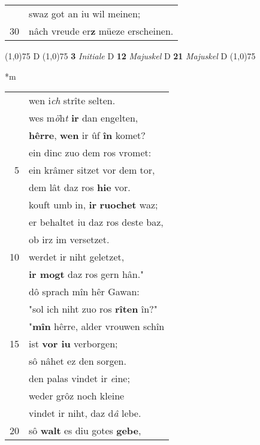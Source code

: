 \documentclass[8pt,a4paper,notitlepage]{article}
\begin{document}
\begin{table}[ht]
\begin{minipage}[t]{0.5\linewidth}
\begin{tabular}{rl}
 & swaz got an iu wil meinen;\\ 
30 & nâch vreude er\textbf{z} müeze erscheinen.\\ 
\end{tabular}
\scriptsize
\line(1,0){75} \newline
D \newline
\line(1,0){75} \newline
\textbf{3} \textit{Initiale} D  \textbf{12} \textit{Majuskel} D  \textbf{21} \textit{Majuskel} D  \newline
\line(1,0){75} \newline
\newline
\end{minipage}
\hspace{0.5cm}
\begin{minipage}[t]{0.5\linewidth}
\small
\begin{center}*m
\end{center}
\begin{tabular}{rl}
 & wen i\textit{ch} strîte selten.\\ 
 & wes m\textit{ö}h\textit{t} \textbf{ir} dan engelten,\\ 
 & \textbf{hêrre}, \textbf{wen} ir ûf \textbf{în} komet?\\ 
 & ein dinc zuo dem ros vromet:\\ 
5 & ein krâmer sitzet vor dem tor,\\ 
 & dem lât daz ros \textbf{hie} vor.\\ 
 & kouft umb in, \textbf{ir} \textbf{ruochet} waz;\\ 
 & er behaltet iu daz ros deste baz,\\ 
 & ob irz im versetzet.\\ 
10 & werdet ir niht geletzet,\\ 
 & \textbf{ir mogt} daz ros gern hân."\\ 
 & dô sprach mîn hêr Gawan:\\ 
 & "sol ich niht zuo ros \textbf{rîten} în?"\\ 
 & "\textbf{mîn} hêrre, alder vrouwen schîn\\ 
15 & ist \textbf{vor iu} verborgen;\\ 
 & sô nâhet ez den sorgen.\\ 
 & den palas vindet ir \textit{e}ine;\\ 
 & weder grôz noch kleine\\ 
 & vindet ir niht, daz d\textit{â} lebe.\\ 
20 & sô \textbf{walt} es diu gotes \textbf{gebe},\\ 

\end{tabular}
\end{minipage}
\end{table}
\end{document}
